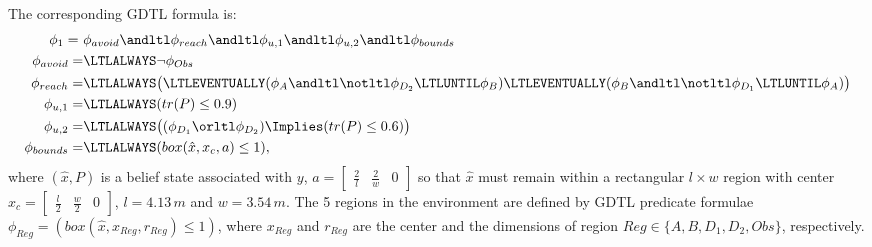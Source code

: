 The corresponding GDTL formula is:
\begin{align}
\label{eq:simple-spec}
\phi_1 =\ & \phi_{avoid}  \andltl \phi_{reach}  \andltl \phi_{u,1} \andltl \phi_{u,2} \andltl \phi_{bounds} \\
\phi_{avoid} = & \LTLALWAYS \neg \phi_{Obs} \nonumber\\
\phi_{reach} = & \LTLALWAYS \big( \LTLEVENTUALLY (\phi_A \andltl \notltl \phi_{D_2} \LTLUNTIL \phi_B) \LTLEVENTUALLY (\phi_B \andltl \notltl \phi_{D_1} \LTLUNTIL \phi_A) \big) \nonumber\\
\phi_{u,1} = & \LTLALWAYS ( tr(P) \leq 0.9) \nonumber\\
\phi_{u,2} =&  \LTLALWAYS \big( ( \phi_{D_1} \orltl \phi_{D_2}) \Implies ( tr(P) \leq 0.6 ) \big) \nonumber\\
\phi_{bounds} =& \LTLALWAYS (box(\hat{x},x_c,a)\leq 1) , \nonumber
\end{align}
where $(\hat{x}, P)$ is a belief state associated with $y$,
$
a = \begin{bmatrix}
\frac{2}{l} & \frac{2}{w} & 0
\end{bmatrix} $
so that
$\hat{x}$ must remain within a rectangular $l\times w$ region
with center $x_c= \begin{bmatrix}
\frac{l}{2} & \frac{w}{2} & 0
\end{bmatrix}$, $l=4.13\,m$ and $w=3.54\,m$.
The 5 regions in the environment are defined by GDTL predicate
formulae $\phi_{Reg} = (box(\hat{x},x_{Reg},r_{Reg})\leq 1)$,
where $x_{Reg}$ and $r_{Reg}$ are the center and the dimensions
of region $Reg \in \{A, B, D_1, D_2, Obs\}$, respectively.

